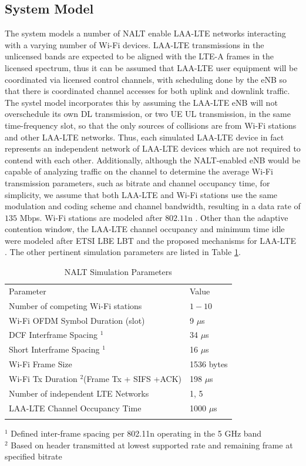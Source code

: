 \subsection{System Model}
\label{sys-model}
The system models a number of NALT enable LAA-LTE networks interacting with a varying number of Wi-Fi devices.  LAA-LTE transmissions in the unlicensed bands are expected to be aligned with the LTE-A frames in the licensed spectrum, thus it can be assumed that \mbox{LAA-LTE} user equipment will be coordinated via licensed control channels, with scheduling done by the eNB so that there is coordinated channel accesses for both uplink and downlink traffic.  The systel model incorporates this by assuming the LAA-LTE eNB will not overschedule its own DL transmission, or two UE UL transmission, in the same time-frequency slot, so that the only sources of collisions are from Wi-Fi stations and other LAA-LTE networks. Thus, each simulated LAA-LTE device in fact represents an independent network of LAA-LTE devices which are not required to contend with each other. Additionally, although the NALT-enabled eNB would be capable of analyzing traffic on the channel to determine the average Wi-Fi transmission parameters, such as bitrate and channel occupancy time, for simplicity, we assume that both \mbox{LAA-LTE} and \mbox{Wi-Fi} stations use the same modulation and coding scheme and channel bandwidth, resulting in a data rate of $135$ Mbps.  Wi-Fi stations are modeled after $802.11$n \cite{80211}.  Other than the adaptive contention window, the LAA-LTE channel occupancy and minimum time idle were modeled after ETSI LBE LBT and the proposed mechanisms for \mbox{LAA-LTE} \cite{3gpp}.  The other pertinent simulation parameters are listed in Table \ref{params}.
\begin{table}
	\caption{NALT Simulation Parameters}
	\label{params}      
	\begin{tabular}{p{8cm}p{4cm}}
		\hline\noalign{\smallskip}
		Parameter & Value \\
		\noalign{\smallskip}\svhline\noalign{\smallskip}
		Number of competing \mbox{Wi-Fi} stations& $1 - 10$ \\ 
		Wi-Fi OFDM Symbol Duration (slot) & 9 $\mu$s    \\ 
		DCF Interframe Spacing $^1$ & 34 $\mu$s   \\ 
		Short Interframe Spacing $^1$ & 16 $\mu$s   \\ 
		\mbox{Wi-Fi} Frame Size & 1536 bytes  \\ 
		\mbox{Wi-Fi} Tx Duration $^2$(Frame Tx + SIFS +ACK) & 198 $\mu$s   \\ 
		Number of independent LTE Networks & 1, 5 \\
		\mbox{LAA-LTE} Channel Occupancy Time  & 1000 $\mu$s \\ 	
		\noalign{\smallskip}\hline\noalign{\smallskip}
	\end{tabular}
	$^1$ Defined inter-frame spacing per 802.11n operating in the 5 GHz band \\
	$^2$ Based on header transmitted at lowest supported rate and remaining frame at specified bitrate	 
\end{table}

